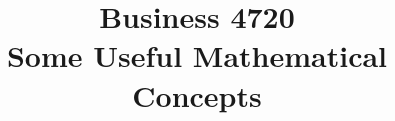 \documentclass{article}
\title{Business 4720\\ \vspace{\baselineskip}
Some Useful Mathematical Concepts}
\begin{document}
\maketitle

\vfill

\clearpage


\end{document}
